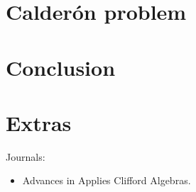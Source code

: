 \documentclass[12pt]{article}
\begin{document}
\section{Calder\'on problem}


\section{Conclusion}


\section{Extras}

Journals:
\begin{itemize}
    \item Advances in Applies Clifford Algebras.
\end{itemize}

%




\end{document}
